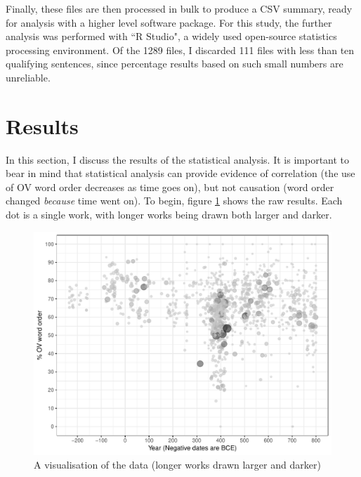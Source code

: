 \documentclass[11pt,a4paper]{scrartcl} %
\begin{document}
\noindent Finally, these files are then processed in bulk to produce a CSV summary, ready for analysis with a higher level software package. For this study, the further analysis was performed with ``R Studio", a widely used open-source statistics processing environment. Of the 1289 files, I discarded 111 files with less than ten qualifying sentences, since percentage results based on such small numbers are unreliable.

\section{Results}

In this section,  I discuss the results of the statistical analysis. It is important to bear in mind that statistical analysis can provide evidence of correlation (the use of OV word order decreases as time goes on), but not causation (word order changed \textit{because} time went on). To begin, figure \ref{fig:sp_empty} shows the raw results. Each dot is a single work, with longer works being drawn both larger and darker. 

\begin{figure}[H]
    \caption{A visualisation of the data (longer works drawn larger and darker)}
    \label{fig:sp_empty}
    \includegraphics[width=\textwidth]{sp_empty.pdf}
\end{figure}
\end{document}
